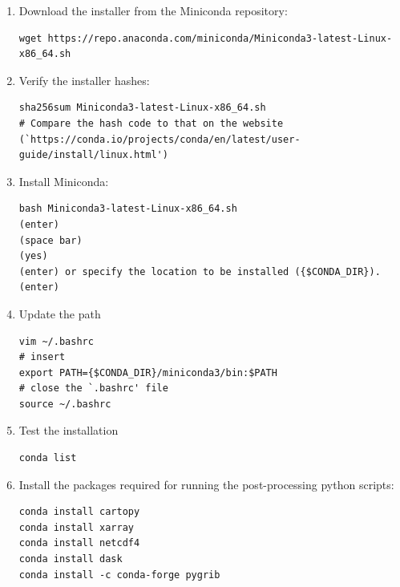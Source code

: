 \documentclass[11pt,fleqn]{report}              %
\begin{document}
\begin{enumerate}

\item Download the installer from the Miniconda repository:
\lstset{language=bash}   
\begin{lstlisting}[frame=trBL]
wget https://repo.anaconda.com/miniconda/Miniconda3-latest-Linux-x86_64.sh
\end{lstlisting}

\item Verify the installer hashes:
\lstset{language=bash}   
\begin{lstlisting}[frame=trBL]
sha256sum Miniconda3-latest-Linux-x86_64.sh
# Compare the hash code to that on the website (`https://conda.io/projects/conda/en/latest/user-guide/install/linux.html')
\end{lstlisting}


\item Install Miniconda:
\lstset{language=bash}   
\begin{lstlisting}[frame=trBL]
bash Miniconda3-latest-Linux-x86_64.sh
(enter)
(space bar)
(yes)
(enter) or specify the location to be installed ({$CONDA_DIR}).
(enter)
\end{lstlisting}

\item Update the path
\lstset{language=bash}   
\begin{lstlisting}[frame=trBL]
vim ~/.bashrc
# insert
export PATH={$CONDA_DIR}/miniconda3/bin:$PATH
# close the `.bashrc' file
source ~/.bashrc
\end{lstlisting}

\item Test the installation
\lstset{language=bash}   
\begin{lstlisting}[frame=trBL]
conda list
\end{lstlisting}

\item Install the packages required for running the post-processing python scripts:
\lstset{language=bash}   
\begin{lstlisting}[frame=trBL]
conda install cartopy
conda install xarray
conda install netcdf4
conda install dask
conda install -c conda-forge pygrib
\end{lstlisting}

\end{enumerate}



\end{document}
